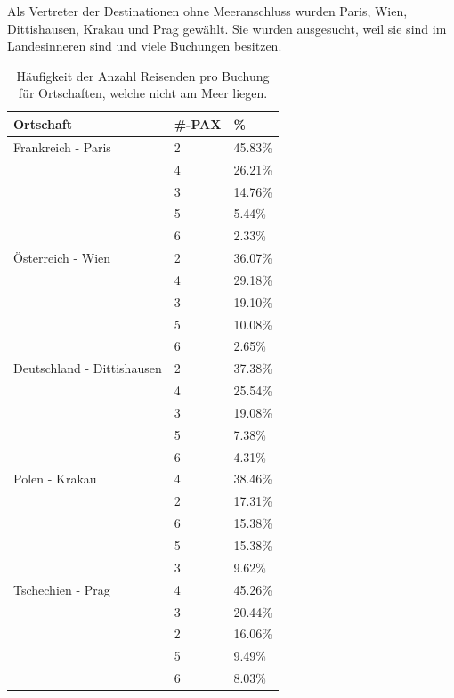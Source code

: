 Als Vertreter der Destinationen ohne Meeranschluss wurden Paris, Wien, Dittishausen, Krakau und Prag gewählt. Sie wurden ausgesucht, weil sie sind im Landesinneren sind und viele Buchungen besitzen. 
\begin{table}[H] 
	\caption{Häufigkeit der Anzahl Reisenden pro Buchung für Ortschaften, welche nicht am Meer liegen.}
	\centering
	\label{sec:testingfazit:testing:hypothesen:3}
	\begin{tabular}{ | l | l | l | } 
		\hline 
		\rowcolor{tableheadcolor}
		\bfseries Ortschaft & \bfseries \#-PAX & \bfseries \% \\ \hline 
		Frankreich - Paris & 2 & 45.83\% \\ \cline{2-3} 
		 & 4 & 26.21\% \\ \cline{2-3}
		 & 3 & 14.76\% \\ \cline{2-3} 
		 & 5 & 5.44\% \\ \cline{2-3}
		 & 6 & 2.33\% \\ \hline 
		Österreich - Wien & 2 & 36.07\% \\ \cline{2-3} 
		 & 4 & 29.18\% \\ \cline{2-3}
		 & 3 & 19.10\% \\ \cline{2-3} 
		 & 5 & 10.08\% \\ \cline{2-3}
		 & 6 & 2.65\% \\ \hline 
		Deutschland - Dittishausen & 2 & 37.38\% \\ \cline{2-3}
		& 4 & 25.54\% \\ \cline{2-3} 
		& 3 & 19.08\% \\ \cline{2-3}
		& 5 & 7.38\% \\ \cline{2-3}
		& 6 & 4.31\% \\ \hline 
		Polen - Krakau & 4 & 38.46\% \\ \cline{2-3}
		& 2 & 17.31\% \\ \cline{2-3} 
		& 6 & 15.38\% \\ \cline{2-3}
		& 5 & 15.38\% \\ \cline{2-3}
		& 3 & 9.62\% \\ \hline 
		Tschechien - Prag & 4 & 45.26\% \\ \cline{2-3} 
		& 3 & 20.44\% \\ \cline{2-3}
		& 2 & 16.06\% \\ \cline{2-3} 
		& 5 & 9.49\% \\ \cline{2-3}
		& 6 & 8.03\% \\ \hline 
	\end{tabular}
\end{table}

